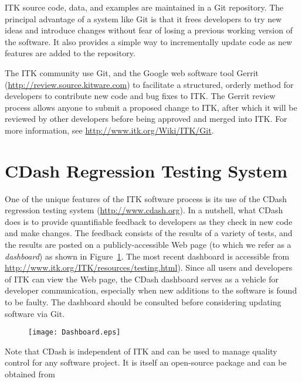 ITK source code, data, and examples are maintained in a Git repository.  The
principal advantage of a system like Git is that it frees developers to try
new ideas and introduce changes without fear of losing a previous working
version of the software. It also provides a simple way to incrementally
update code as new features are added to the repository.

The ITK community use Git, and the Google web software tool Gerrit
(\url{http://review.source.kitware.com}) to facilitate a structured,
orderly method for developers to contribute new code and bug fixes to
ITK. The Gerrit review process allows anyone to submit a proposed
change to ITK, after which it will be reviewed by other developers
before being approved and merged into ITK.  For more information, see
\url{http://www.itk.org/Wiki/ITK/Git}.


\section{CDash Regression Testing System}
\label{sec:CDash}
\label{sec:QualityDashboard}


One of the unique features of the ITK software process is its use of the CDash
regression testing system (\url{http://www.cdash.org}). In a
nutshell, what CDash does is to provide quantifiable feedback to developers as
they check in new code and make changes. The feedback consists of the results
of a variety of tests, and the results are posted on a publicly-accessible
Web page (to which we refer as a \emph{dashboard}) as shown in
Figure~\ref{fig:Dashboard}. The most recent dashboard is accessible from
\url{http://www.itk.org/ITK/resources/testing.html}). Since all users and developers of
ITK can view the Web page, the CDash dashboard serves as a vehicle for
developer communication, especially when new additions to the software is
found to be faulty.  The dashboard should be consulted before considering
updating software via Git.


\begin{figure}[ht]
\centering 
\texttt{[image: Dashboard.eps]}
\label{fig:Dashboard}
\end{figure}

Note that CDash is independent of ITK and can be used to manage quality
control for any software project. It is itself an open-source package and can
be obtained from

